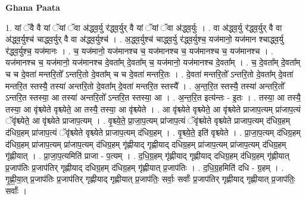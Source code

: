 \documentclass[17pt]{extarticle}
\begin{document}
\textbf{Ghana Paata } \newline

1. यां ॅवै वै यां ॅयां ॅवा अ॑द्ध्व॒र्यु र॑द्ध्व॒र्युर् वै यां ॅयां ॅवा अ॑द्ध्व॒र्युः । . वा अ॑द्ध्व॒र्यु र॑द्ध्व॒र्युर् वै वा अ॑द्ध्व॒र्युश्च॑ चाद्ध्व॒र्युर् वै वा अ॑द्ध्व॒र्युश्च॑ । . अ॒द्ध्व॒र्युश्च॑ चाद्ध्व॒र्यु र॑द्ध्व॒र्युश्च॒ यज॑मानो॒ यज॑मान श्चाद्ध्व॒र्यु र॑द्ध्व॒र्युश्च॒ यज॑मानः । . च॒ यज॑मानो॒ यज॑मानश्च च॒ यज॑मानश्च च॒ यज॑मानश्च च॒ यज॑मानश्च । . यज॑मानश्च च॒ यज॑मानो॒ यज॑मानश्च दे॒वता᳚म् दे॒वता᳚म् च॒ यज॑मानो॒ यज॑मानश्च दे॒वता᳚म् । . च॒ दे॒वता᳚म् दे॒वता᳚म् च च दे॒वता॑ मन्तरि॒तो᳚ ऽन्तरि॒तो दे॒वता᳚म् च च दे॒वता॑ मन्तरि॒तः । . दे॒वता॑ मन्तरि॒तो᳚ ऽन्तरि॒तो दे॒वता᳚म् दे॒वता॑ मन्तरि॒त स्तस्यै॒ तस्या॑ अन्तरि॒तो दे॒वता᳚म् दे॒वता॑ मन्तरि॒त स्तस्यै᳚ । . अ॒न्त॒रि॒त स्तस्यै॒ तस्या॑ अन्तरि॒तो᳚ ऽन्तरि॒त स्तस्या॒ आ तस्या॑ अन्तरि॒तो᳚ ऽन्तरि॒त स्तस्या॒ आ । . अ॒न्त॒रि॒त इत्य॑न्तः - इ॒तः । . तस्या॒ आ तस्यै॒ तस्या॒ आ वृ॑श्च्येते वृश्च्येते॒ आ तस्यै॒ तस्या॒ आ वृ॑श्च्येते । . आ वृ॑श्च्येते वृश्च्येते॒ आ वृ॑श्च्येते प्राजाप॒त्यम् प्रा॑जाप॒त्यं ॅवृ॑श्च्येते॒ आ वृ॑श्च्येते प्राजाप॒त्यम् । . वृ॒श्च्ये॒ते॒ प्रा॒जा॒प॒त्यम् प्रा॑जाप॒त्यं ॅवृ॑श्च्येते वृश्च्येते प्राजाप॒त्यम् द॑धिग्र॒हम् द॑धिग्र॒हम् प्रा॑जाप॒त्यं ॅवृ॑श्च्येते वृश्च्येते प्राजाप॒त्यम् द॑धिग्र॒हम् । . वृ॒श्च्ये॒ते॒ इति॑ वृश्च्येते । . प्रा॒जा॒प॒त्यम् द॑धिग्र॒हम् द॑धिग्र॒हम् प्रा॑जाप॒त्यम् प्रा॑जाप॒त्यम् द॑धिग्र॒हम् गृ॑ह्णीयाद् गृह्णीयाद् दधिग्र॒हम् प्रा॑जाप॒त्यम् प्रा॑जाप॒त्यम् द॑धिग्र॒हम् गृ॑ह्णीयात् । . प्रा॒जा॒प॒त्यमिति॑ प्राजा - प॒त्यम् । . द॒धि॒ग्र॒हम् गृ॑ह्णीयाद् गृह्णीयाद् दधिग्र॒हम् द॑धिग्र॒हम् गृ॑ह्णीयात् प्र॒जाप॑तिः प्र॒जाप॑तिर् गृह्णीयाद् दधिग्र॒हम् द॑धिग्र॒हम् गृ॑ह्णीयात् प्र॒जाप॑तिः । . द॒धि॒ग्र॒हमिति॑ दधि - ग्र॒हम् । . गृ॒ह्णी॒या॒त् प्र॒जाप॑तिः प्र॒जाप॑तिर् गृह्णीयाद् गृह्णीयात् प्र॒जाप॑तिः॒ सर्वाः॒ सर्वाः᳚ प्र॒जाप॑तिर् गृह्णीयाद् गृह्णीयात् प्र॒जाप॑तिः॒ सर्वाः᳚ । \newline
\end{document}
